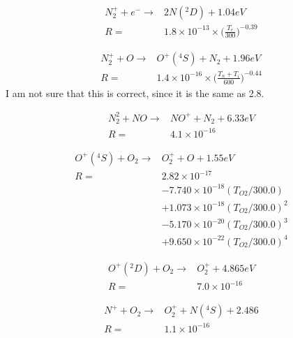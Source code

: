 \documentclass[twoside,10pt]{book}
\begin{document}
\begin{equation}
\begin{split}
N_2^+ + e^- \rightarrow & 2N(^2D) + 1.04 eV \\
R = & 1.8\times 10^{-13} \times \bigg(\frac{T_e}{300}\bigg)^{-0.39}
\end{split}
\end{equation}

\begin{equation}
\begin{split}
N_2^+ + O \rightarrow & O^+(^4S) + N_2 + 1.96 eV \\
R = & 1.4\times 10^{-16} \times \bigg(\frac{T_n+T_i}{600}\bigg)^{-0.44}
\end{split}
\end{equation}
I am not sure that this is correct, since it is the same as 2.8.

\begin{equation}
\begin{split}
N_2^2 + NO \rightarrow & NO^+ + N_2 + 6.33 eV \\
R = & 4.1 \times 10^{-16}
\end{split}
\end{equation}

\begin{equation}
\begin{split}
O^+(^4S) + O_2  \rightarrow & O_2^+ + O + 1.55 eV \\
R  =  & 2.82 \times 10^{-17} \\
      &    - 7.740\times 10^{-18}(T_{O2}/300.0) \\
      &    + 1.073\times 10^{-18}(T_{O2}/300.0)^2 \\
      &    - 5.170\times 10^{-20}(T_{O2}/300.0)^3 \\
      &    + 9.650\times 10^{-22}(T_{O2}/300.0)^4
\end{split}
\end{equation}

\begin{equation}
\begin{split}
O^+(^2D) + O_2 \rightarrow & O_2^+ + 4.865 eV \\
R = & 7.0 \times 10^{-16}
\end{split}
\end{equation}

\begin{equation}
\begin{split}
N^+ + O_2 \rightarrow & O_2^+ + N(^4S) + 2.486 \\
R = & 1.1 \times 10^{-16}
\end{split}
\end{equation}
\end{document}
